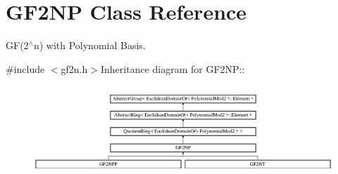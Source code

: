 \hypertarget{class_g_f2_n_p}{
\section{GF2NP Class Reference}
\label{class_g_f2_n_p}
}


GF(2$^\wedge$n) with Polynomial Basis.  


{\ttfamily \#include $<$gf2n.h$>$}Inheritance diagram for GF2NP::\begin{figure}[H]
\begin{center}
\leavevmode
\includegraphics[height=3.45679cm]{class_g_f2_n_p}
\end{center}
\end{figure}

